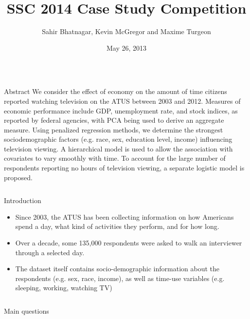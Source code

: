 \documentclass[final]{beamer}
\title{SSC 2014 Case Study Competition}
\author{Sahir Bhatnagar, Kevin McGregor and Maxime Turgeon}
\institute{Department of Epidemiology, Biostatistics and Occupational Health, McGill University}
\date{May 26, 2013}
\newcounter{acolumn}%
\def\autoheight{\vspace*{0pt}}%
\begin{document}
  \begin{frame} 
    \vfill
    
        \begin{acolumns}[t]
          \begin{column}{.32\linewidth}
          
            \begin{block}{Abstract}
    			We consider the effect of economy on the amount of time citizens reported watching television on the ATUS  between 2003 and 2012. Measures of economic performance include GDP, unemployment rate, and stock indices, as reported by federal agencies, with PCA being used to derive an aggregate measure. Using penalized regression methods, we determine the strongest sociodemographic factors (e.g. race, sex, education level, income) influencing television viewing. A hierarchical model is used to allow the association with covariates to vary smoothly with time. To account for the large number of respondents reporting no hours of television viewing, a separate logistic model is proposed.
              \autoheight 
            \end{block}
            
          
          \end{column}
          
          \begin{column}{.32\linewidth}
            \begin{block}{Introduction}
              \begin{itemize}
              	\item Since 2003, the ATUS has been collecting information on how Americans spend a day, what kind of activities they perform, and for how long.
              	\item Over a decade, some 135,000 respondents were asked to walk an interviewer through a selected day.
              	\item The dataset itself contains socio-demographic information about the respondents (e.g. sex, race, income), as well as time-use variables (e.g. sleeping, working, watching TV)
              \end{itemize}
              \autoheight 
            \end{block}
    
          \end{column}
          
          \begin{column}{.32\linewidth}
           \begin{block}{Main questions}
            

\end{block}
\end{column}
\end{acolumns}
\end{frame}
\end{document}
